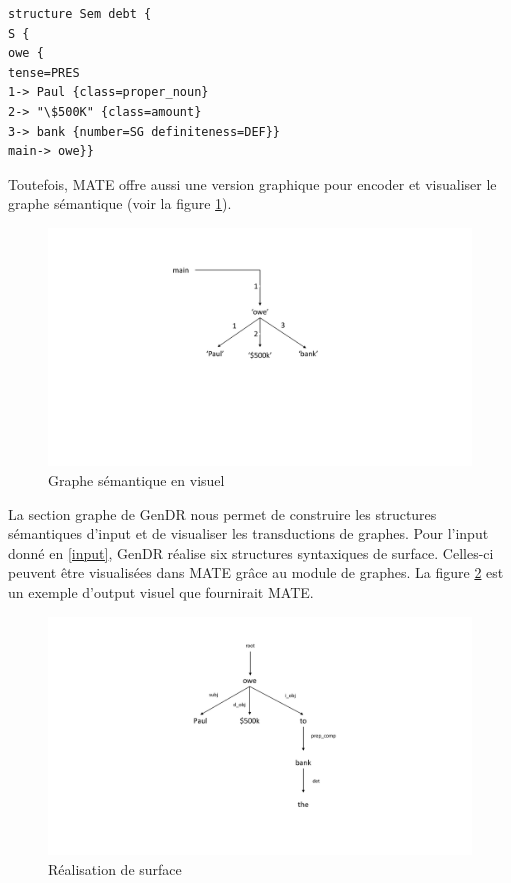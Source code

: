 \begin{lstlisting}[language=XML, caption = Input sémantique, label=input]
structure Sem debt {
S {
owe {
tense=PRES
1-> Paul {class=proper_noun}
2-> "\$500K" {class=amount}
3-> bank {number=SG definiteness=DEF}}
main-> owe}}
\end{lstlisting}

Toutefois, MATE offre aussi une version graphique pour encoder et visualiser le graphe sémantique (voir la figure \ref{fig:graphesem}).
\begin{figure}[htb]
	\centering
	\includegraphics[width=1\textwidth, trim = {0cm 4cm 0cm 3cm},clip]{ch3/figs/owe_sem.pdf}
	\caption{Graphe sémantique en visuel}
	\label{fig:graphesem}
\end{figure}

La section graphe de GenDR nous permet de construire les structures sémantiques d'input et de visualiser les transductions de graphes. Pour l'input donné en \ref{input}, GenDR réalise six structures syntaxiques de surface. Celles-ci peuvent être visualisées dans MATE grâce au module de graphes. La figure \ref{fig:realsurfex} est un exemple d'output visuel que fournirait MATE. 

\begin{figure}[htb]
	\centering
	\includegraphics[width=1\textwidth, trim = {0cm 2cm 0cm 2cm},clip]{ch3/figs/realsurfex.pdf}
	\caption{Réalisation de surface}
	\label{fig:realsurfex}
\end{figure}

